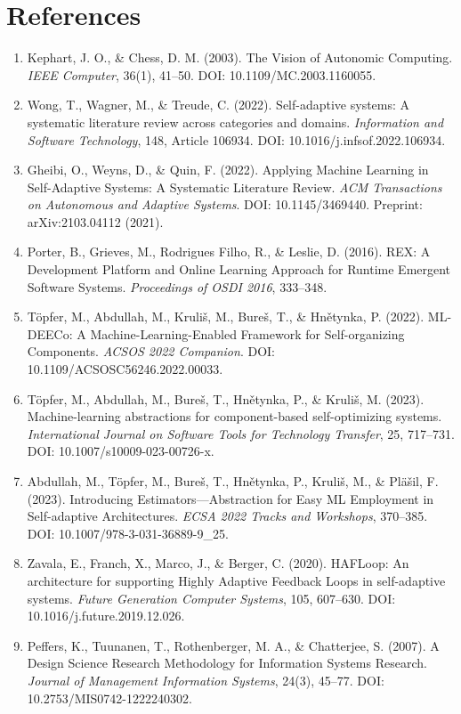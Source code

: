 \documentclass[11pt,a4paper]{article}
\begin{document}
\section{References}
\begin{enumerate}
\item Kephart, J. O., \& Chess, D. M. (2003). The Vision of Autonomic Computing. \textit{IEEE Computer}, 36(1), 41--50. DOI: 10.1109/MC.2003.1160055.
\item Wong, T., Wagner, M., \& Treude, C. (2022). Self-adaptive systems: A systematic literature review across categories and domains. \textit{Information and Software Technology}, 148, Article 106934. DOI: 10.1016/j.infsof.2022.106934.
\item Gheibi, O., Weyns, D., \& Quin, F. (2022). Applying Machine Learning in Self-Adaptive Systems: A Systematic Literature Review. \textit{ACM Transactions on Autonomous and Adaptive Systems}. DOI: 10.1145/3469440. Preprint: arXiv:2103.04112 (2021).
\item Porter, B., Grieves, M., Rodrigues Filho, R., \& Leslie, D. (2016). REX: A Development Platform and Online Learning Approach for Runtime Emergent Software Systems. \textit{Proceedings of OSDI 2016}, 333--348.
\item T\"opfer, M., Abdullah, M., Kruli\v{s}, M., Bure\v{s}, T., \& Hn\v{e}tynka, P. (2022). ML-DEECo: A Machine-Learning-Enabled Framework for Self-organizing Components. \textit{ACSOS 2022 Companion}. DOI: 10.1109/ACSOSC56246.2022.00033.
\item T\"opfer, M., Abdullah, M., Bure\v{s}, T., Hn\v{e}tynka, P., \& Kruli\v{s}, M. (2023). Machine-learning abstractions for component-based self-optimizing systems. \textit{International Journal on Software Tools for Technology Transfer}, 25, 717--731. DOI: 10.1007/s10009-023-00726-x.
\item Abdullah, M., T\"opfer, M., Bure\v{s}, T., Hn\v{e}tynka, P., Kruli\v{s}, M., \& Pl\"a\v{s}il, F. (2023). Introducing Estimators---Abstraction for Easy ML Employment in Self-adaptive Architectures. \textit{ECSA 2022 Tracks and Workshops}, 370--385. DOI: 10.1007/978-3-031-36889-9\_25.
\item Zavala, E., Franch, X., Marco, J., \& Berger, C. (2020). HAFLoop: An architecture for supporting Highly Adaptive Feedback Loops in self-adaptive systems. \textit{Future Generation Computer Systems}, 105, 607--630. DOI: 10.1016/j.future.2019.12.026.
\item Peffers, K., Tuunanen, T., Rothenberger, M. A., \& Chatterjee, S. (2007). A Design Science Research Methodology for Information Systems Research. \textit{Journal of Management Information Systems}, 24(3), 45--77. DOI: 10.2753/MIS0742-1222240302.

\end{enumerate}
\end{document}

